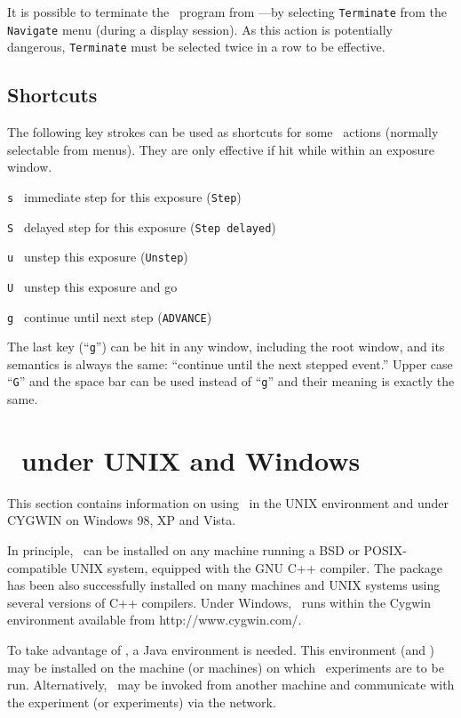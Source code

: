 It is possible to terminate the \smurph\ program from \dsd---by selecting
{\tt Terminate} from the {\tt Navigate} menu (during a display
session).
As this action is potentially dangerous, {\tt Terminate} must be selected
twice in a row to be effective.

\subsection{Shortcuts}
\label{rm_ds_sh}

The following key strokes can be used as shortcuts for some \dsd\ actions
(normally selectable from menus).
They are only effective if hit while within an exposure window.

\noindent
{\tt s~} immediate step for this exposure ({\tt Step})

\noindent
{\tt S~} delayed step for this exposure ({\tt Step~delayed})

\noindent
{\tt u~} unstep this exposure ({\tt Unstep})

\noindent
{\tt U~} unstep this exposure and go

\noindent
{\tt g~} continue until next step ({\tt ADVANCE})

\medskip

The last key (``{\tt g}'') can be hit in any window, including the root window,
and its semantics is always the same: ``continue until the next stepped
event.''
Upper case ``{\tt G}'' and the space bar can be used instead of ``{\tt g}''
and their meaning is exactly the same.

\section{\smurph\ under UNIX and Windows}
\label{rm_un}

This section contains information on using \smurph\ in the UNIX
environment and under CYGWIN on Windows 98, XP and Vista.

In principle, \smurph\ can be installed on any machine running
a BSD or POSIX-compatible UNIX system, equipped with the GNU C++ compiler.
The package has been also successfully installed on many machines
and UNIX systems using several versions of C++ compilers.
Under Windows, \smurph\ runs within the Cygwin environment available
from {http://www.cygwin.com/}.

To take advantage of \dsd, a Java environment is needed.
This environment (and \dsd) may
be installed on the machine (or machines) on which
\smurph\ experiments are to be run.
Alternatively, \dsd\ may be invoked from another machine and communicate
with the experiment (or experiments) via the network.

